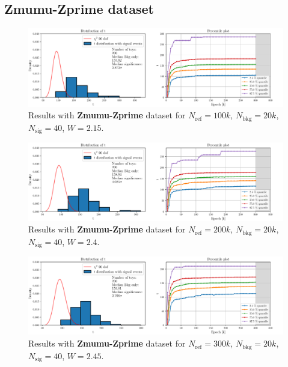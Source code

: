 \subsection*{Zmumu-Zprime dataset}
\vspace{-5mm}
\begin{figure}[H]
	\centering
	\includegraphics[width=1.0\textwidth]{Python/RESULTS/ref100000_bkg20000_sig40/data_ref100000_bkg20000_sig40_wclip2-15.pdf}
	\caption{Results with \textbf{Zmumu-Zprime} dataset for $N_\mathrm{ref}=100\si{k}$, $N_\mathrm{bkg}=20\si{k}$, $N_\mathrm{sig}=40$, $W=2.15$.}
	\label{fig:REF100000_BKG20000_SIG40_WCLIP2.15}
\end{figure}
\vspace{-5mm}
\begin{figure}[H]
	\centering
	\includegraphics[width=1.0\textwidth]{Python/RESULTS/ref200000_bkg20000_sig40/data_ref200000_bkg20000_sig40_wclip2-4.pdf}
	\caption{Results with \textbf{Zmumu-Zprime} dataset for $N_\mathrm{ref}=200\si{k}$, $N_\mathrm{bkg}=20\si{k}$, $N_\mathrm{sig}=40$, $W=2.4$.}
	\label{fig:REF200000_BKG20000_SIG40_WCLIP2.4}
\end{figure}
\vspace{-5mm}
\begin{figure}[H]
	\centering
	\includegraphics[width=1.0\textwidth]{Python/RESULTS/ref300000_bkg20000_sig40/data_ref300000_bkg20000_sig40_wclip2-45.pdf}
	\caption{Results with \textbf{Zmumu-Zprime} dataset for $N_\mathrm{ref}=300\si{k}$, $N_\mathrm{bkg}=20\si{k}$, $N_\mathrm{sig}=40$, $W=2.45$.}
	\label{fig:REF300000_BKG20000_SIG40_WCLIP2.45}
\end{figure}

